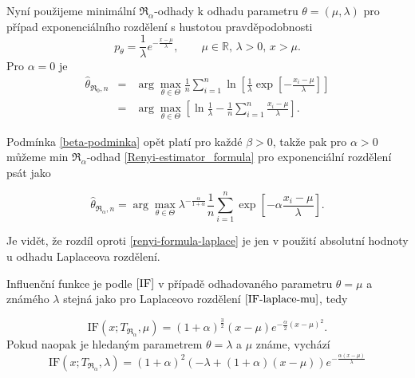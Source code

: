 Nyní použijeme minimální $\mathfrak{R}_\alpha$-odhady k odhadu parametru $\theta = (\mu,\lambda)$ pro případ exponenciálního rozdělení s hustotou pravděpodobnosti
\begin{equation}
	p_\theta = \frac{1}{\lambda} e^{-\frac{x-\mu}{\lambda}}, \qquad \mu\in \mathbb{R},\, \lambda>0, \, x>\mu.
\end{equation}
Pro $\alpha = 0$ je 
\begin{eqnarray}
	\hat{\theta}_{\mathfrak{R}_0,n} & = & \arg \max_{\theta \in \Theta} \frac{1}{n} \sum^n_{i=1} \ln \left[ \frac{1}{\lambda}\exp \left[-\frac{x_i-\mu}{\lambda} \right] \right] \nonumber \\
	& = & \arg \max_{\theta \in \Theta} \left[ \ln \frac{1}{\lambda} - \frac{1}{n} \sum^n_{i=1} \frac{x_i-\mu}{\lambda} \right].
\end{eqnarray}

\noindent Podmínka \ref{beta-podminka} opět platí pro každé $\beta>0$, takže pak pro $\alpha>0$ můžeme  min $\mathfrak{R}_\alpha$-odhad \eqref{Renyi-estimator_formula} pro exponenciální rozdělení psát jako 

\begin{equation}
	\hat{\theta}_{\mathfrak{R}_\alpha,n} = \arg \max_{\theta \in \Theta} \lambda^{-\frac{\alpha}{1+\alpha}} \frac{1}{n}\sum_{i=1}^n \exp \left[-\alpha\frac{x_i-\mu}{\lambda} \right].
	\label{renyi-formula-exponential}
\end{equation}

\noindent Je vidět, že rozdíl oproti \eqref{renyi-formula-laplace} je jen v použití absolutní hodnoty u odhadu Laplaceova rozdělení. 

Influenční funkce je podle $\eqref{IF}$ v případě odhadovaného parametru $\theta = \mu$ a známého $ \lambda$ stejná jako pro Laplaceovo rozdělení $\eqref{IF-laplace-mu}$, tedy 

\begin{equation}
	\mathrm{IF}(x;T_{\mathfrak{R}_\alpha},\mu) = (1+\alpha )^{\frac{3}{2}} (x-\mu )  e^{-\frac{\alpha}{2} (x-\mu )^2}. %
	\label{IF-exponential-mu}
\end{equation}
Pokud naopak je hledaným parametrem $\theta = \lambda$ a $ \mu $ známe, vychází 
\begin{equation}
	\mathrm{IF}(x;T_{\mathfrak{R}_\alpha},\lambda) =	(1+\alpha )^2 \left( - \lambda +(1+ \alpha)(x-\mu)\right) e^{-\frac{\alpha (x-\mu)}{\lambda }} %
	\label{IF-exponential-lambda}
\end{equation}

